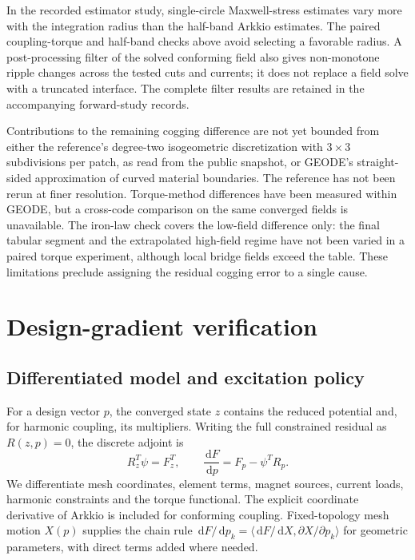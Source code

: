 \documentclass{anvil-paper}
\newcommand{\dd}{\,\mathrm{d}}
\begin{document}
In the recorded estimator study, single-circle Maxwell-stress estimates
vary more with the integration radius than the half-band Arkkio estimates.
The paired coupling-torque and half-band checks above avoid selecting a
favorable radius. A post-processing filter of the solved conforming field
also gives non-monotone ripple changes across the tested cuts and currents;
it does not replace a field solve with a truncated interface. The complete
filter results are retained in the accompanying forward-study records.

Contributions to the remaining cogging difference are not yet bounded
from either the reference's degree-two isogeometric discretization with
$3\times3$ subdivisions per patch, as read from the public snapshot, or
GEODE's straight-sided approximation of curved material boundaries. The reference has not been rerun at finer
resolution. Torque-method differences have been measured within GEODE,
but a cross-code comparison on the same converged fields is unavailable.
The iron-law check covers the low-field difference only: the final tabular
segment and the extrapolated high-field regime have not been varied in a
paired torque experiment, although local bridge fields exceed the table.
These limitations preclude assigning the residual cogging error to a
single cause.

\section{Design-gradient verification}\label{sec:gradients}
\subsection{Differentiated model and excitation policy}
For a design vector $p$, the converged state $z$ contains the reduced
potential and, for harmonic coupling, its multipliers. Writing the full
constrained residual as $R(z,p)=0$, the discrete adjoint is
\begin{equation}
 R_z^T\psi=F_z^T,\qquad
 \frac{\dd F}{\dd p}=F_p-\psi^T R_p.
 \label{eq:adjoint}
\end{equation}
We differentiate mesh coordinates, element terms, magnet sources, current
loads, harmonic constraints and the torque functional. The explicit
coordinate derivative of Arkkio is included for conforming coupling.
Fixed-topology mesh motion $X(p)$ supplies the chain rule
$\dd F/\dd p_k=\langle\dd F/\dd X,\partial X/\partial p_k\rangle$
for geometric parameters, with direct terms added where needed.
\end{document}
